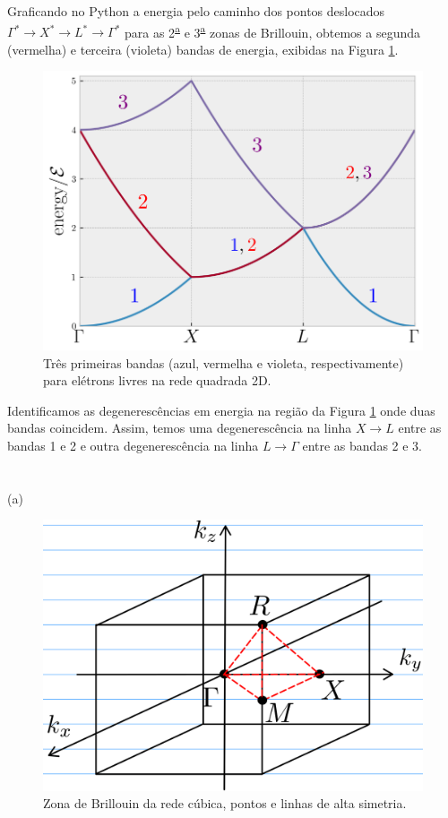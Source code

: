 \documentclass[a4paper,10pt]{article}
\begin{document}
\n\n

Graficando no Python a energia pelo caminho dos pontos deslocados $\Gamma^* \to X^* \to L^* \to \Gamma^*$ para as 2\textsuperscript{\underline{a}} e 3\textsuperscript{\underline{a}} zonas de Brillouin, obtemos a segunda (vermelha) e terceira (violeta) bandas de energia, exibidas na Figura \ref{fig:band_struct_square_free-123}.
\begin{figure}[H]
\centering
\includegraphics[width=0.7\linewidth]{fig/band_struct_square_free-123-labels.png}
\caption{Três primeiras bandas (azul, vermelha e violeta, respectivamente) para elétrons livres na rede quadrada 2D.}
\label{fig:band_struct_square_free-123}
\end{figure}

\n

Identificamos as degenerescências em energia na região da Figura \ref{fig:band_struct_square_free-123} onde duas bandas coincidem. Assim, temos uma degenerescência na linha $X \to L$ entre as bandas 1 e 2 e outra degenerescência na linha $L \to \Gamma$ entre as bandas 2 e 3.

\pagebreak

\section{}

(a)

\begin{figure}[H]
\centering
\includegraphics[width=0.4\linewidth]{fig/cubicbz.png}
\caption{Zona de Brillouin da rede cúbica, pontos e linhas de alta simetria.}
\label{fig:cubicbz}
\end{figure}
\end{document}
